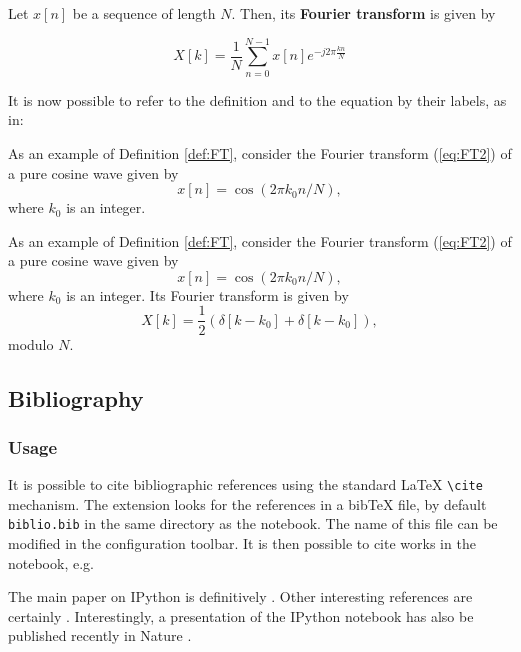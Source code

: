     \begin{definition}
\label{def:FT} Let $x[n]$ be a sequence of length $N$. Then, its
\textbf{Fourier transform} is given by

\begin{equation}
\label{eq:FT2}
X[k]= \frac{1}{N} \sum_{n=0}^{N-1} x[n] e^{-j2\pi \frac{kn}{N}}
\end{equation}
\end{definition}

    It is now possible to refer to the definition and to the equation by
their labels, as in:

\begin{listing}
As an example of Definition \ref{def:FT}, consider the Fourier transform (\ref{eq:FT2}) of a pure cosine wave given by
$$
x[n]= \cos(2\pi k_0 n/N),
$$
where $k_0$ is an integer. 
\end{listing}

    As an example of Definition \ref{def:FT}, consider the Fourier transform
(\ref{eq:FT2}) of a pure cosine wave given by \begin{equation}
x[n]= \cos(2\pi k_0 n/N),
\end{equation} where $k_0$ is an integer. Its Fourier transform is given by \begin{equation}
X[k] = \frac{1}{2} \left( \delta[k-k_0] + \delta[k-k_0] \right), 
\end{equation} modulo $N$.

    \subsection{Bibliography}\label{bibliography}

    \subsubsection{Usage}\label{usage}

    It is possible to cite bibliographic references using the standard LaTeX
\texttt{\textbackslash{}cite} mechanism. The extension looks for the
references in a bibTeX file, by default \texttt{biblio.bib} in the same
directory as the notebook. The name of this file can be modified in the
configuration toolbar. It is then possible to cite works in the
notebook, e.g.

\begin{listing}
The main paper on IPython is definitively \cite{PER-GRA:2007}. Other interesting references are certainly \cite{mckinney2012python, rossant2013learning}. Interestingly, a presentation of the IPython notebook has also be published recently in Nature \cite{shen2014interactive}.
\end{listing}

